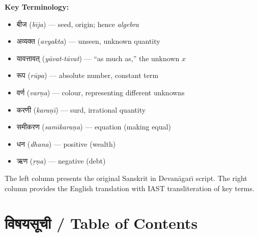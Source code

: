 \documentclass[11pt,a4paper]{article}
\newcommand{\dev}[1]{{\devanagarifont #1}}
\begin{document}
\textbf{Key Terminology:}
\begin{itemize}[leftmargin=2em]
  \item \dev{बीज} (\textit{b\={\i}ja}) --- seed, origin; hence \textit{algebra}
  \item \dev{अव्यक्त} (\textit{avyakta}) --- unseen, unknown quantity
  \item \dev{यावत्तावत्} (\textit{y\={a}vat-t\={a}vat}) --- ``as much as,'' the unknown $x$
  \item \dev{रूप} (\textit{r\={u}pa}) --- absolute number, constant term
  \item \dev{वर्ण} (\textit{var\d{n}a}) --- colour, representing different unknowns
  \item \dev{करणी} (\textit{kara\d{n}\={\i}}) --- surd, irrational quantity
  \item \dev{समीकरण} (\textit{sam\={\i}kara\d{n}a}) --- equation (making equal)
  \item \dev{धन} (\textit{dhana}) --- positive (wealth)
  \item \dev{ऋण} (\textit{\d{r}\d{n}a}) --- negative (debt)
\end{itemize}

The left column presents the original Sanskrit in Devan\={a}gar\={\i} script. The right column provides the English translation with IAST transliteration of key terms.

\clearpage

\section*{\dev{विषयसूची} / Table of Contents}
\end{document}
